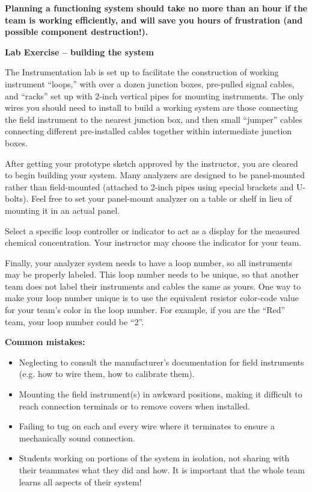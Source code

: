 \vskip 10pt

{\bf Planning a functioning system should take no more than an hour if the team is working efficiently, and will save you hours of frustration (and possible component destruction!).}





\vfil \eject

\noindent
{\bf Lab Exercise -- building the system}

\vskip 5pt

The Instrumentation lab is set up to facilitate the construction of working instrument ``loops,'' with over a dozen junction boxes, pre-pulled signal cables, and ``racks'' set up with 2-inch vertical pipes for mounting instruments.  The only wires you should need to install to build a working system are those connecting the field instrument to the nearest junction box, and then small ``jumper'' cables connecting different pre-installed cables together within intermediate junction boxes.

After getting your prototype sketch approved by the instructor, you are cleared to begin building your system.  Many analyzers are designed to be panel-mounted rather than field-mounted (attached to 2-inch pipes using special brackets and U-bolts).  Feel free to set your panel-mount analyzer on a table or shelf in lieu of mounting it in an actual panel.  

Select a specific loop controller or indicator to act as a display for the measured chemical concentration.  Your instructor may choose the indicator for your team.  

Finally, your analyzer system needs to have a loop number, so all instruments may be properly labeled.  This loop number needs to be unique, so that another team does not label their instruments and cables the same as yours.  One way to make your loop number unique is to use the equivalent resistor color-code value for your team's color in the loop number.  For example, if you are the ``Red'' team, your loop number could be ``2''. 

\vskip 10pt

{\bf Common mistakes:}

\begin{itemize}
\item{} Neglecting to consult the manufacturer's documentation for field instruments (e.g. how to wire them, how to calibrate them).
\item{} Mounting the field instrument(s) in awkward positions, making it difficult to reach connection terminals or to remove covers when installed.
\item{} Failing to tug on each and every wire where it terminates to ensure a mechanically sound connection.
\item{} Students working on portions of the system in isolation, not sharing with their teammates what they did and how.  It is important that the whole team learns all aspects of their system!
\end{itemize}


